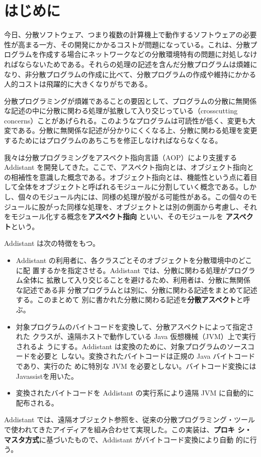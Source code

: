\chapter{はじめに}




今日、分散ソフトウェア、つまり複数の計算機上で動作するソフトウェアの必要
性が高まる一方、その開発にかかるコストが問題になっている。これは、分散プ
ログラムを作成する場合にネットワークなどの分散環境特有の問題に対処しなけ
ればならないためである。それらの処理の記述を含んだ分散プログラムは煩雑に
なり、非分散プログラムの作成に比べて、分散プログラムの作成や維持にかかる
人的コストは飛躍的に大きくなりがちである。

分散プログラミングが煩雑であることの要因として、プログラムの分散に無関係
な記述の中に分散に関わる処理が拡散して入り交じっている（crosscutting
concerns）ことがあげられる。このようなプログラムは可読性が低く、変更も大
変である。分散に無関係な記述が分かりにくくなる上、分散に関わる処理を変更
するためにはプログラムのあちこちを修正しなければならなくなる。

我々は分散プログラミングをアスペクト指向言語（AOP）により支援する 
Addistant を開発してきた。ここで、アスペクト指向とは、オブジェクト指向と
の相補性を意識した概念である。オブジェクト指向とは、機能性という点に着目
して全体をオブジェクトと呼ばれるモジュールに分割していく概念である。しか
し、個々のモジュール内には、同様の処理が股がる可能性がある。この個々のモ
ジュールに股がった同様な処理を、オブジェクトとは別の側面から考慮し、それ
をモジュール化する概念を{\bf{アスペクト指向}} といい、そのモジュールを
{\bf{アスペクト}}という。

Addistant は次の特徴をもつ。
%
\begin{itemize}
\item{
Addistant の利用者に、各クラスごとそのオブジェクトを分散環境中のどこに配
置するかを指定させる。Addistant では、分散に関わる処理がプログラム全体に
拡散して入り交じることを避けるため、利用者は、分散に無関係な記述である非
分散プログラムとは別に、分散に関わる記述をまとめて記述する。このまとめて
別に書かれた分散に関わる記述を{\bf{分散アスペクト}}と呼ぶ。
}
\item{
対象プログラムのバイトコードを変換して、分散アスペクトによって指定された
クラスが、遠隔ホストで動作している Java 仮想機械（JVM）上で実行されるよ
うにする。Addistant は変換のために、対象プログラムのソースコードを必要と
しない。変換されたバイトコードは正規の Java バイトコードであり、実行のた
めに特別な JVM を必要としない。バイトコード変換には 
Javassistを用いた。
}
\item{
変換されたバイトコードを Addistant の実行系により遠隔 JVM に自動的に
配布される。
}
\end{itemize}
%
\noindent
Addistant では、遠隔オブジェクト参照を、従来の分散プログラミング・ツール
で使われてきたアイディアを組み合わせて実現した。この実装は、{\bf{プロキ
シ・マスタ方式}}に基づいたもので、Addistant がバイトコード変換により自動
的に行う。

